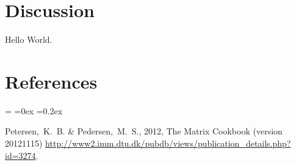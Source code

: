 \documentclass[12pt]{article}
\begin{document}
\clearpage
\section{Discussion}

Hello World.

\clearpage
\section*{References}
\begin{list}{}{%
    \rightmargin=0in
    \leftmargin=\parindent
    \topsep=0ex
    \partopsep=0pt
    \itemsep=0.2ex
    \parsep=0pt
    \leftmargin
    \leftmargin}
\item Petersen,~K.~B. \& Pedersen,~M.~S., 2012, The Matrix Cookbook (version 20121115)
\url{http://www2.imm.dtu.dk/pubdb/views/publication_details.php?id=3274}.
\end{list}
\end{document}
